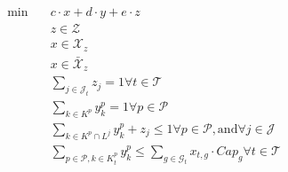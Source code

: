 \begin{align}
  \min\quad & c \cdot x + d \cdot y + e \cdot z \tag{eq\_0001} \\
  & z \in \mathcal{Z} \tag{eq\_0002} \\
  & x \in \mathcal{X}_{z} \tag{eq\_0003} \\
  & x \in \bar{\mathcal{X}}_{z} \tag{eq\_0006} \\
  & \sum_{j \in \mathcal{J}_{t}} z_{j} = 1 \forall t \in \mathcal{T} \tag{eq\_0007} \\
  & \sum_{k \in K^{p}} y_{k}^{p} = 1 \forall p \in \mathcal{P} \tag{eq\_0008} \\
  & \sum_{k \in K^{p} \cap L^{j}} y_{k}^{p} + z_{j} \leq 1 \forall p \in \mathcal{P} , \text{and} \forall j \in \mathcal{J} \tag{eq\_0009} \\
  & \sum_{p \in \mathcal{P}, k \in K_{t}^{p}} y_{k}^{p} \leq \sum_{g \in \mathcal{G}_{t}} x_{t , g} \cdot \mathit{Cap}_{g} \forall t \in \mathcal{T} \tag{eq\_0010} \\
\end{align}
